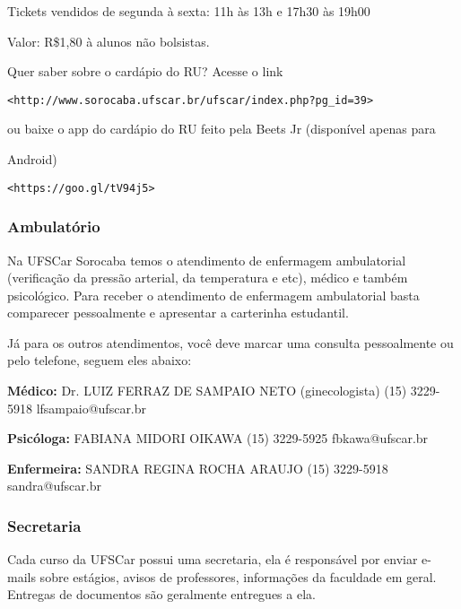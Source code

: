 Tickets vendidos de segunda à sexta: 11h às 13h e 17h30 às 19h00

Valor: R\$1,80 à alunos não bolsistas.

Quer saber sobre o cardápio do RU? Acesse o link

\texttt{<http://www.sorocaba.ufscar.br/ufscar/index.php?pg\_id=39>}

ou baixe o app do cardápio do RU feito pela Beets Jr (disponível apenas para

Android)

\texttt{<https://goo.gl/tV94j5>}

\subsubsection{Ambulatório}
Na UFSCar Sorocaba temos o atendimento de enfermagem ambulatorial (verificação da pressão arterial, da temperatura e etc), médico e também psicológico. Para receber o atendimento de enfermagem ambulatorial basta comparecer pessoalmente e apresentar a carterinha estudantil.

Já para os outros atendimentos, você deve marcar uma consulta pessoalmente ou pelo telefone, seguem eles abaixo:

\noindent \textbf{Médico:}
\newline Dr. LUIZ FERRAZ DE SAMPAIO NETO (ginecologista)
\newline (15) 3229-5918
\newline lfsampaio@ufscar.br

\begin{multicols}{2}
\noindent \textbf{Psicóloga:}
  \newline FABIANA MIDORI OIKAWA
  \newline (15) 3229-5925
  \newline fbkawa@ufscar.br

\noindent \textbf{Enfermeira:}
  \newline SANDRA REGINA ROCHA ARAUJO
  \newline (15) 3229-5918
  \newline sandra@ufscar.br

\end{multicols}

\subsubsection{Secretaria}
Cada curso da UFSCar possui uma secretaria, ela é responsável por enviar e-mails sobre estágios, avisos de professores, informações da faculdade em geral. Entregas de documentos são geralmente entregues a ela.

